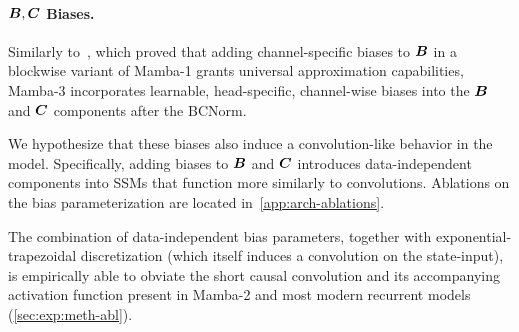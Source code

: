 \paragraph{${\bm{B}}, {\bm{C}}$ Biases.}
Similarly to~\citet{yu2025blockbiasedmamba}, which proved that adding channel-specific biases to ${\bm{B}}$ in a blockwise variant of Mamba-1 grants universal approximation capabilities, Mamba-3 incorporates learnable, head-specific, channel-wise biases into the ${\bm{B}}$ and ${\bm{C}}$ components after the BCNorm.

We hypothesize that these biases also induce a convolution-like behavior in the model. Specifically, adding biases to ${\bm{B}}$ and ${\bm{C}}$ introduces data-independent components into SSMs that function more similarly to convolutions.
Ablations on the bias parameterization are located in~\cref{app:arch-ablations}.

The combination of data-independent bias parameters, together with exponential-trapezoidal discretization (which itself induces a convolution on the state-input),
is empirically able to obviate the short causal convolution and its accompanying activation function present in Mamba-2 and most modern recurrent models (\cref{sec:exp:meth-abl}).
